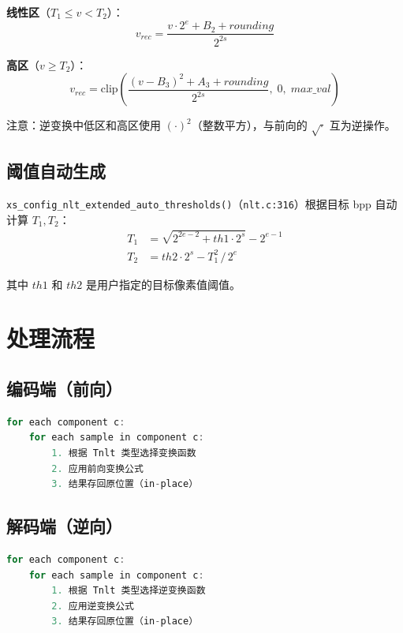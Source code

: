 \textbf{线性区}（$T_1 \leq v < T_2$）：
\begin{equation}
v_{\mathit{rec}} = \frac{v \cdot 2^e + B_2 + \mathit{rounding}}{2^{2s}}
\end{equation}

\textbf{高区}（$v \geq T_2$）：
\begin{equation}
v_{\mathit{rec}} = \mathrm{clip}\!\left(\frac{(v - B_3)^2 + A_3 + \mathit{rounding}}{2^{2s}},\; 0,\; \mathit{max\_val}\right)
\end{equation}

注意：逆变换中低区和高区使用 $(\cdot)^2$（整数平方），与前向的 $\sqrt{\cdot}$ 互为逆操作。

\subsection{阈值自动生成}

\texttt{xs\_config\_nlt\_extended\_auto\_thresholds()}（\texttt{nlt.c:316}）根据目标 bpp 自动计算 $T_1, T_2$：
\begin{align}
T_1 &= \sqrt{2^{2e-2} + \mathit{th1} \cdot 2^s} - 2^{e-1} \\
T_2 &= \mathit{th2} \cdot 2^s - T_1^2 \,/\, 2^e
\end{align}

其中 $\mathit{th1}$ 和 $\mathit{th2}$ 是用户指定的目标像素值阈值。

\section{处理流程}

\subsection{编码端（前向）}

\begin{lstlisting}[language=C,numbers=none]
for each component c:
    for each sample in component c:
        1. 根据 Tnlt 类型选择变换函数
        2. 应用前向变换公式
        3. 结果存回原位置（in-place）
\end{lstlisting}

\subsection{解码端（逆向）}

\begin{lstlisting}[language=C,numbers=none]
for each component c:
    for each sample in component c:
        1. 根据 Tnlt 类型选择逆变换函数
        2. 应用逆变换公式
        3. 结果存回原位置（in-place）
\end{lstlisting}

